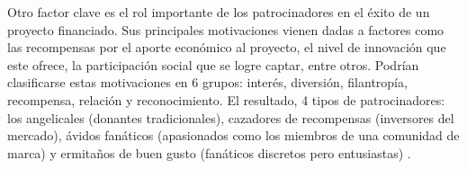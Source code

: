 Otro factor clave es el rol importante de los patrocinadores en el éxito de un proyecto financiado. Sus principales motivaciones vienen dadas a factores como las recompensas por el aporte económico al proyecto, el nivel de innovación que este ofrece, la participación social que se logre captar, entre otros. Podrían clasificarse estas motivaciones en 6 grupos: interés, diversión, filantropía, recompensa, relación y reconocimiento. El resultado, 4 tipos de patrocinadores: los angelicales (donantes tradicionales), cazadores de recompensas (inversores del mercado), ávidos fanáticos (apasionados como los miembros de una comunidad de marca) y ermitaños de buen gusto (fanáticos discretos pero entusiastas) \parencite{cr_tung2019backers}.